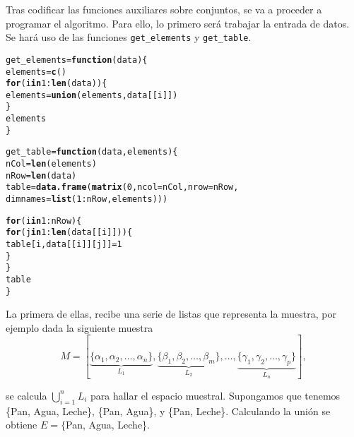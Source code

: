\documentclass[12pt]{report}\usepackage[]{graphicx}\usepackage[dvipsnames]{xcolor}
\makeatletter
\newcommand{\hlnum}[1]{\textcolor[rgb]{0.686,0.059,0.569}{#1}}%
\newcommand{\hlopt}[1]{\textcolor[rgb]{0,0,0}{#1}}%
\newcommand{\hlstd}[1]{\textcolor[rgb]{0.345,0.345,0.345}{#1}}%
\newcommand{\hlkwa}[1]{\textcolor[rgb]{0.161,0.373,0.58}{\textbf{#1}}}%
\newcommand{\hlkwb}[1]{\textcolor[rgb]{0.69,0.353,0.396}{#1}}%
\newcommand{\hlkwc}[1]{\textcolor[rgb]{0.333,0.667,0.333}{#1}}%
\newcommand{\hlkwd}[1]{\textcolor[rgb]{0.737,0.353,0.396}{\textbf{#1}}}%
\newenvironment{kframe}{%
 \def\at@end@of@kframe{}%
 \ifinner\ifhmode%
  \def\at@end@of@kframe{\end{minipage}}%
  \begin{minipage}{\columnwidth}%
 \fi\fi%
 \def\FrameCommand##1{\hskip\@totalleftmargin \hskip-\fboxsep
 \colorbox{shadecolor}{##1}\hskip-\fboxsep
     \hskip-\linewidth \hskip-\@totalleftmargin \hskip\columnwidth}%
 \MakeFramed {\advance\hsize-\width
   \@totalleftmargin\z@ \linewidth\hsize
   \@setminipage}}%
 {\par\unskip\endMakeFramed%
 \at@end@of@kframe}
\newenvironment{knitrout}{}{} %
\makeatother
\begin{document}
			Tras codificar las funciones auxiliares sobre conjuntos, se va a proceder a programar el algoritmo. Para ello, lo primero será trabajar la entrada de datos. Se hará uso de las funciones \texttt{get\_elements} y \texttt{get\_table}. 
			
\begin{knitrout}
\color{fgcolor}\begin{kframe}
\begin{alltt}
\hlstd{get_elements} \hlkwb{=} \hlkwa{function}\hlstd{(}\hlkwc{data}\hlstd{) \{}
        \hlstd{elements} \hlkwb{=} \hlkwd{c}\hlstd{()}
        \hlkwa{for} \hlstd{(i} \hlkwa{in} \hlnum{1}\hlopt{:}\hlkwd{len}\hlstd{(data)) \{}
                \hlstd{elements} \hlkwb{=} \hlkwd{union}\hlstd{(elements, data[[i]])}
        \hlstd{\}}
        \hlstd{elements}
\hlstd{\}}

\hlstd{get_table} \hlkwb{=} \hlkwa{function}\hlstd{(}\hlkwc{data}\hlstd{,} \hlkwc{elements}\hlstd{) \{}
        \hlstd{nCol} \hlkwb{=} \hlkwd{len}\hlstd{(elements)}
        \hlstd{nRow} \hlkwb{=} \hlkwd{len}\hlstd{(data)}
        \hlstd{table} \hlkwb{=} \hlkwd{data.frame}\hlstd{(}\hlkwd{matrix}\hlstd{(}\hlnum{0}\hlstd{,} \hlkwc{ncol} \hlstd{= nCol,} \hlkwc{nrow} \hlstd{= nRow,}
                \hlkwc{dimnames} \hlstd{=} \hlkwd{list}\hlstd{(}\hlnum{1}\hlopt{:}\hlstd{nRow, elements)))}

        \hlkwa{for} \hlstd{(i} \hlkwa{in} \hlnum{1}\hlopt{:}\hlstd{nRow) \{}
                \hlkwa{for} \hlstd{(j} \hlkwa{in} \hlnum{1}\hlopt{:}\hlkwd{len}\hlstd{(data[[i]])) \{}
                        \hlstd{table[i, data[[i]][j]]} \hlkwb{=} \hlnum{1}
                \hlstd{\}}
        \hlstd{\}}
        \hlstd{table}
\hlstd{\}}
\end{alltt}
\end{kframe}
\end{knitrout}
			
			La primera de ellas, recibe una serie de listas que representa la muestra, por ejemplo dada la siguiente muestra
			$$
			M = [\underbrace{\{\alpha_1, \alpha_2, \ldots, \alpha_n\}}_{L_1}, \underbrace{\{\beta_{1}, \beta_{2}, \ldots, \beta_{m}\}}_{L_2}, \ldots, \underbrace{\{\gamma_1, \gamma_2, \ldots, \gamma_{p}\}}_{L_n}], 
			$$
			
			se calcula $\bigcup_{i=1}^{n} L_i$ para hallar el espacio muestral. Supongamos que tenemos \{Pan, Agua, Leche\}, \{Pan, Agua\}, y \{Pan, Leche\}. Calculando la unión se obtiene $E = \{$Pan, Agua, Leche\}. \\
			
\end{document}
